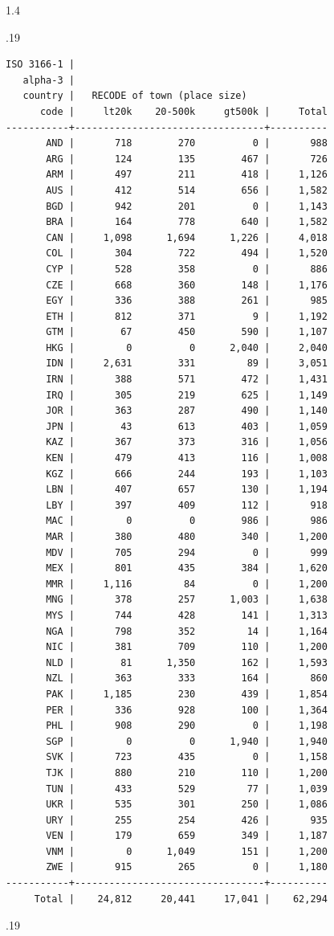 \documentclass[10pt, letterpaper]{article}
\begin{document}
\begin{spacing}{1.4}
\begin{scriptsize}
\begin{spacing}{.19}
\begin{verbatim}
ISO 3166-1 |
   alpha-3 |
   country |   RECODE of town (place size)
      code |     lt20k    20-500k     gt500k |     Total
-----------+---------------------------------+----------
       AND |       718        270          0 |       988 
       ARG |       124        135        467 |       726 
       ARM |       497        211        418 |     1,126 
       AUS |       412        514        656 |     1,582 
       BGD |       942        201          0 |     1,143 
       BRA |       164        778        640 |     1,582 
       CAN |     1,098      1,694      1,226 |     4,018 
       COL |       304        722        494 |     1,520 
       CYP |       528        358          0 |       886 
       CZE |       668        360        148 |     1,176 
       EGY |       336        388        261 |       985 
       ETH |       812        371          9 |     1,192 
       GTM |        67        450        590 |     1,107 
       HKG |         0          0      2,040 |     2,040 
       IDN |     2,631        331         89 |     3,051 
       IRN |       388        571        472 |     1,431 
       IRQ |       305        219        625 |     1,149 
       JOR |       363        287        490 |     1,140 
       JPN |        43        613        403 |     1,059 
       KAZ |       367        373        316 |     1,056 
       KEN |       479        413        116 |     1,008 
       KGZ |       666        244        193 |     1,103 
       LBN |       407        657        130 |     1,194 
       LBY |       397        409        112 |       918 
       MAC |         0          0        986 |       986 
       MAR |       380        480        340 |     1,200 
       MDV |       705        294          0 |       999 
       MEX |       801        435        384 |     1,620 
       MMR |     1,116         84          0 |     1,200 
       MNG |       378        257      1,003 |     1,638 
       MYS |       744        428        141 |     1,313 
       NGA |       798        352         14 |     1,164 
       NIC |       381        709        110 |     1,200 
       NLD |        81      1,350        162 |     1,593 
       NZL |       363        333        164 |       860 
       PAK |     1,185        230        439 |     1,854 
       PER |       336        928        100 |     1,364 
       PHL |       908        290          0 |     1,198 
       SGP |         0          0      1,940 |     1,940 
       SVK |       723        435          0 |     1,158 
       TJK |       880        210        110 |     1,200 
       TUN |       433        529         77 |     1,039 
       UKR |       535        301        250 |     1,086 
       URY |       255        254        426 |       935 
       VEN |       179        659        349 |     1,187 
       VNM |         0      1,049        151 |     1,200 
       ZWE |       915        265          0 |     1,180 
-----------+---------------------------------+----------
     Total |    24,812     20,441     17,041 |    62,294 
\end{verbatim}
\end{spacing}{.19}
\end{scriptsize}


\end{spacing}
\end{document}
